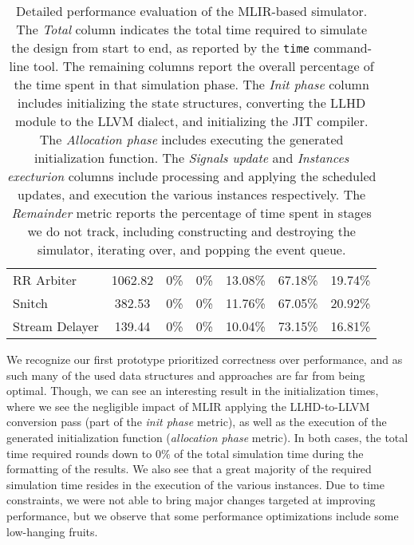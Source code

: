 \begin{table}[ht]
{\begin{tabular}{lcccccc}
      RR Arbiter      & 1062.82            & 0\%                       & 0\%                        & 13.08\%                    & 67.18\%                    & 19.74\%            \\
      Snitch          & 382.53             & 0\%                       & 0\%                        & 11.76\%                    & 67.05\%                    & 20.92\%            \\
      Stream Delayer  & 139.44             & 0\%                       & 0\%                        & 10.04\%                    & 73.15\%                    & 16.81\%            \\
      \bottomrule
    \end{tabular}
  }
  \caption[Detailed performance evaluation of the MLIR-based simulator]{Detailed performance evaluation of the MLIR-based simulator. The \textit{Total} column indicates the total time required to simulate the design from start to end, as reported by the \texttt{time} command-line tool. The remaining columns report the overall percentage of the time spent in that simulation phase. The \textit{Init phase} column includes initializing the state structures, converting the LLHD module to the LLVM dialect, and initializing the JIT compiler. The \textit{Allocation phase} includes executing the generated initialization function. The \textit{Signals update} and \textit{Instances execturion} columns include processing and applying the scheduled updates, and execution the various instances respectively. The \textit{Remainder} metric reports the percentage of time spent in stages we do not track, including constructing and destroying the simulator, iterating over, and popping the event queue.}
  \label{tab:time_detail0}
\end{table}

We recognize our first prototype prioritized correctness over performance, and as such many of the used data structures and approaches are far from being optimal. Though, we can see an interesting result in the initialization times, where we see the negligible impact of MLIR applying the LLHD-to-LLVM conversion pass (part of the \textit{init phase} metric), as well as the execution of the generated initialization function (\textit{allocation phase} metric). In both cases, the total time required rounds down to $0\%$ of the total simulation time during the formatting of the results. We also see that a great majority of the required simulation time resides in the execution of the various instances. Due to time constraints, we were not able to bring major changes targeted at improving performance, but we observe that some performance optimizations include some low-hanging fruits.

